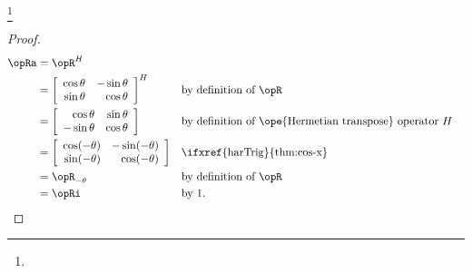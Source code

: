 \begin{example}
\footnote{
  }
\label{ex:operator_rotation_unitary}
\mbox{}\\
\end{example}
\begin{proof}
\begin{align*}
  \opRa
    &= \opR^H
  \\&= \left[\begin{array}{rr}
         \cos\theta & -\sin\theta   \\
         \sin\theta &  \cos\theta
       \end{array}\right]^H
    && \text{by definition of $\opR$}
  \\&= \left[\begin{array}{rr}
          \cos\theta &  \sin\theta   \\
         -\sin\theta &  \cos\theta
       \end{array}\right]
    && \text{by definition of \ope{Hermetian transpose} operator $H$}
  \\&= \left[\begin{array}{rr}
          \cos(-\theta) & -\sin(-\theta)   \\
          \sin(-\theta) &  \cos(-\theta)
       \end{array}\right]
    && \text{\ifxref{harTrig}{thm:cos-x}}
  \\&= \opR_{-\theta}
    && \text{by definition of $\opR$}
  \\&= \opRi
    && \text{by 1.}
\end{align*}
\end{proof}

